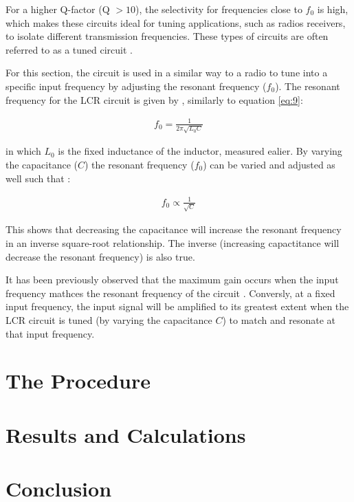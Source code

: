 \documentclass[12pt]{article}
\begin{document}
For a higher Q-factor (Q $> 10$), the selectivity for frequencies close to $f_0$ is high, which makes these circuits ideal for tuning applications, such as radios receivers, 
to isolate different transmission frequencies. These types of circuits are often referred to as a tuned circuit \cite{UCDlcr}.

For this section, the circuit is used in a similar way to a radio to tune into a specific input frequency by adjusting the resonant frequency ($f_0$).
The resonant frequency for the LCR circuit is given by \cite{UCDlcr}, similarly to equation \ref{eq:9}:

\begin{gather} \label{eq:10}
    f_0 = \frac{1}{2 \pi \sqrt{L_0C}}
\end{gather}

in which $L_0$ is the fixed inductance of the inductor, measured ealier. By varying the capacitance ($C$) the resonant frequency ($f_0$) can be varied and adjusted as well such that \cite{UCDlcr}:

\begin{gather}
    f_0 \propto \frac{1}{\sqrt{C}}
\end{gather}

This shows that decreasing the capacitance will increase the resonant frequency in an inverse square-root relationship. 
The inverse (increasing capactitance will decrease the resonant \allowbreak frequency) is also true.

It has been previously observed that the maximum gain occurs when the input frequency mathces the resonant frequency of the circuit \cite{UCDlcr}. 
Conversly, at a fixed input frequency, the input signal will be amplified to its greatest extent when the LCR circuit is tuned (by varying the capacitance $C$) to match and resonate at that input frequency.

\section{The Procedure}



\section{Results and Calculations}



\section{Conclusion}
\end{document}
